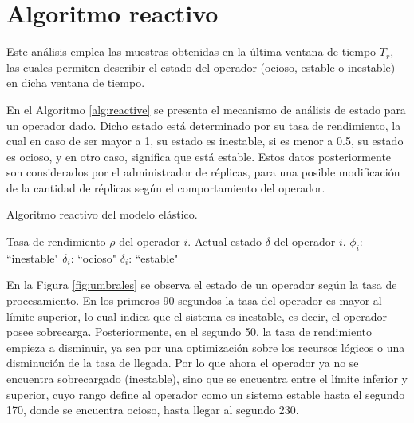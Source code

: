 \section{Algoritmo reactivo}


\normalsize{Este an\'alisis emplea las muestras obtenidas en la \'ultima ventana de tiempo $T_r$, las cuales permiten describir el estado del operador (ocioso, estable o inestable) en dicha ventana de tiempo.}

En el Algoritmo \ref{alg:reactive} se presenta el mecanismo de an\'alisis de estado para un operador dado. Dicho estado est\'a determinado por su tasa de rendimiento, la cual en caso de ser mayor a 1, su estado es inestable, si es menor a 0.5, su estado es ocioso, y en otro caso, significa que est\'a estable. Estos datos posteriormente son considerados por el administrador de r\'eplicas, para una posible modificaci\'on de la cantidad de r\'eplicas seg\'un el comportamiento del operador.

\begin{algorithm}[!ht]
	\caption{Algoritmo reactivo del modelo el\'astico.}
	\label{alg:reactive}
	\begin{algorithmic}[1]
	\REQUIRE Tasa de rendimiento $\rho$ del operador $i$.
	\ENSURE Actual estado $\delta$ del operador $i$.
		\RETURN $\phi_i$: ``inestable"
		\RETURN $\delta_i$: ``ocioso"
	\ELSE
		\RETURN $\delta_i$: ``estable"
	\ENDIF
	\end{algorithmic}
\end{algorithm}

En la Figura \ref{fig:umbrales} se observa el estado de un operador seg\'un la tasa de procesamiento. En los primeros 90 segundos la tasa del operador es mayor al l\'imite superior, lo cual indica que el sistema es inestable, es decir, el operador posee sobrecarga. Posteriormente, en el segundo 50, la tasa de rendimiento empieza a disminuir, ya sea por una optimizaci\'on sobre los recursos l\'ogicos o una disminuci\'on de la tasa de llegada. \normalsize{Por lo que ahora el operador ya no se encuentra sobrecargado (inestable), sino que se encuentra entre el l\'imite inferior y superior, cuyo rango define al operador como un sistema estable hasta el segundo 170, donde se encuentra ocioso, hasta llegar al segundo 230.}

